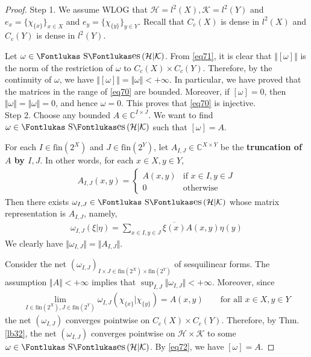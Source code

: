 \documentclass[12pt,b5paper,notitlepage]{article}
\theoremstyle{definition}
\theoremstyle{plain}
\DeclareMathOperator{\Ses}{\text{\Fontlukas S}\text{\kern -0pt {\Fontlukas\large es}}\,}
\newcommand{\ovl}{\overline}
\newcommand{\Cbb}{\mathbb C}
\newcommand{\fin}{\mathrm{fin}}
\newcommand{\MH}{\mathcal H}
\newcommand{\MK}{\mathcal K}
\numberwithin{equation}{section}
\begin{document}
\begin{proof}
Step 1. We assume WLOG that $\MH=l^2(X),\MK=l^2(Y)$ and $e_x=\{\chi_{\{x\}}\}_{x\in X}$ and $e_y=\{\chi_{\{y\}}\}_{y\in Y}$. Recall that $C_c(X)$ is dense in $l^2(X)$ and $C_c(Y)$ is dense in $l^2(Y)$.

Let $\omega\in\Ses(\MH|\MK)$. From \eqref{eq71}, it is clear that $\Vert[\omega]\Vert$ is the norm of the restriction of $\omega$ to $C_c(X)\times C_c(Y)$. Therefore, by the continuity of $\omega$, we have $\Vert[\omega]\Vert=\Vert\omega\Vert<+\infty$. In particular, we have proved that the matrices in the range of \eqref{eq70} are bounded. Moreover, if $[\omega]=0$, then $\Vert\omega\Vert=\Vert\omega\Vert=0$, and hence $\omega=0$. This proves that \eqref{eq70} is injective.\\[-1ex]


Step 2. Choose any bounded $A\in\Cbb^{I\times J}$. We want to find $\omega\in\Ses(\MH|\MK)$ such that $[\omega]=A$.


For each $I\in\fin(2^X)$ and $J\in\fin(2^Y)$, let $A_{I,J}\in\Cbb^{X\times Y}$ be the \textbf{truncation of $A$ by $I,J$}.  In other words, for each $x\in X,y\in Y$,
\begin{align*}
A_{I,J}(x,y)=\left\{
\begin{array}{ll}
A(x,y)&\text{if }x\in I,y\in J\\[0.5ex]
0&\text{otherwise}
\end{array}
\right.
\end{align*}
Then there exists $\omega_{I,J}\in\Ses(\MH|\MK)$ whose matrix representation is $A_{I,J}$, namely,
\begin{align*}
\omega_{I,J}(\xi|\eta)=\sum_{x\in I,y\in J}\ovl{\xi(x)}A(x,y)\eta(y)
\end{align*}
We clearly have $\Vert\omega_{I,J}\Vert=\Vert A_{I,J}\Vert$.

Consider the net $(\omega_{I,J})_{I\times J\in\fin(2^X)\times\fin(2^Y)}$ of sesquilinear forms. The assumption $\Vert A\Vert<+\infty$ implies that $\sup_{I,J}\Vert\omega_{I,J}\Vert<+\infty$. Moreover, since
\begin{align}\label{eq72}
\lim_{I\in\fin(2^X),J\in\fin(2^Y)}\omega_{I,J}(\chi_{\{x\}}|\chi_{\{y\}})=A(x,y)\qquad\text{for all }x\in X,y\in Y
\end{align}
the net $(\omega_{I,J})$ converges pointwise on $C_c(X)\times C_c(Y)$. Therefore, by Thm. \ref{lb32},  the net $(\omega_{I,J})$ converges pointwise on $\MH\times\MK$ to some $\omega\in\Ses(\MH|\MK)$. By \eqref{eq72}, we have $[\omega]=A$.
\end{proof}
\end{document}
